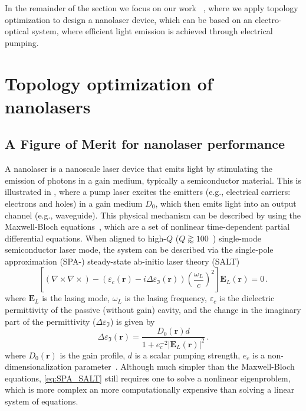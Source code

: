 In the remainder of the section we focus on our work~\cite{ownpub4} , where we apply topology 
optimization to design a nanolaser device, which can be based on an electro-optical system, where
 efficient light emission is achieved through electrical pumping.

\section{Topology optimization of nanolasers~\cite{ownpub4}}

\subsection*{A Figure of Merit for nanolaser performance}

A nanolaser is a nanoscale laser device that emits light by stimulating the emission of photons in a gain medium, typically a semiconductor material. This is illustrated
in , where a pump laser excites the emitters (e.g., electrical carriers: electrons and holes) in a gain medium $D_0$, which then emits light into an output channel (e.g., waveguide). This physical
mechanism can be described by using the Maxwell-Bloch equations~\cite{haken_laser_dynamics, PhysRev.134.A1429, SALT_original}, which are a set of nonlinear time-dependent 
partial differential equations. When aligned to high-$Q$ ($Q\gtrapprox 100$~\cite{cerjan_2016}) single-mode semiconductor laser
mode, the system can be described via the single-pole approximation (SPA-) steady-state ab-initio laser theory (SALT)~\cite{Ge_2010}
\begin{equation}\label{eq:SPA_SALT}
    {\left[(\nabla \times 
     \nabla \times ) -\left(\varepsilon_c(\mathbf{r})-i \Delta \varepsilon_\Im (\mathbf{r})\right) \left(\frac{\omega_L}{c}\right)^2\right] \mathbf{E}_L(\mathbf{r})=0}\,.
\end{equation}
where $\mathbf{E}_L$ is the lasing mode, $\omega_L$ is the lasing frequency, $\varepsilon_c$ is the dielectric permittivity of the passive (without gain) cavity, and the change in the 
imaginary part of the permittivity ($\Delta \varepsilon_\Im$) is given by
\begin{equation}\label{eq:gain_SALT}
        \Delta \varepsilon_\Im (\mathbf{r}) =  \frac{D_0(\mathbf{r}) d}{1+ e_c^{-2}\left|\mathbf{E}_L(\mathbf{r})\right|^2}\,.
\end{equation}
where $D_0(\mathbf{r})$ is the gain profile, $d$ is a scalar pumping strength, $e_c$ is a non-dimensionalization parameter~\cite{Ge_2010}. Although much simpler than the Maxwell-Bloch equations, \eqref{eq:SPA_SALT} still
requires one to solve a nonlinear eigenproblem, which is more complex an more computationally expensive than solving a linear system of equations.


